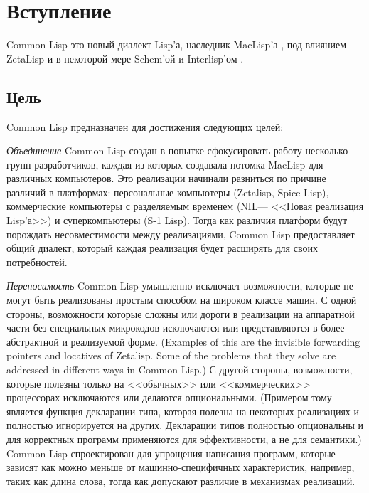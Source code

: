 \else

\chapter{Вступление}

Common Lisp это новый диалект Lisp'а, наследник
MacLisp'а \cite{MOONUAL,PITMANUAL}, под влиянием
ZetaLisp \cite{BLUE-LISPM,GREEN-LISPM} и в некоторой мере
Schem'ой \cite{SCHEME-REVISED-REPORT} и Interlisp'ом \cite{INTERLISP}.

\section{Цель}

Common Lisp предназначен для достижения следующих целей: 

\begin{flushdesc}
\item[\emph{Объединение}]
Common Lisp создан в попытке сфокусировать работу несколько групп
разработчиков, каждая из которых создавала потомка MacLisp для
различных компьютеров. Это реализации начинали разниться по
причине различий в платформах: персональные компьютеры (Zetalisp,
Spice Lisp), коммерческие компьютеры с разделяемым временем
(NIL--- <<Новая реализация Lisp'а>>) и суперкомпьютеры (S-1
Lisp). Тогда как различия платформ будут порождать несовместимости
между реализациями, Common Lisp предоставляет общий диалект,
который каждая реализация будет расширять для своих потребностей.

\item[\emph{Переносимость}]
\begingroup{}
Common Lisp умышленно исключает возможности, которые не могут быть
реализованы простым способом на широком классе машин. С одной
стороны, возможности которые сложны или дороги в реализации на
аппаратной части без специальных микрокодов исключаются или
представляются в более абстрактной и реализуемой форме.
(Examples of this are the invisible forwarding pointers
and locatives of Zetalisp.  Some of the problems that they solve
are addressed in different ways in Common Lisp.)
С другой стороны, возможности, которые полезны только на
<<обычных>> или <<коммерческих>> процессорах исключаются или
делаются опциональными. (Примером тому является функция декларации
типа, которая полезна на некоторых реализациях и полностью
игнорируется на других. Декларации типов полностью опциональны и
для корректных программ применяются для эффективности, а не для семантики.)
Common Lisp спроектирован для упрощения написания программ,
которые зависят как можно меньше от машинно-специфичных
характеристик, например, таких как длина слова, тогда как
допускают различие в механизмах реализаций.
\par\endgroup


\end{flushdesc}
